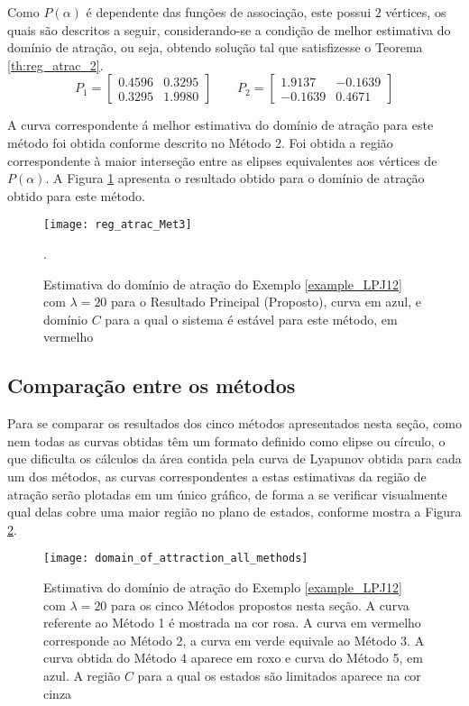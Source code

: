 Como $P(\alpha)$ é dependente das funções de associação, este possui $2$ vértices, os quais são descritos a seguir, considerando-se a condição de melhor estimativa do domínio de atração, ou seja, obtendo solução tal que satisfizesse o Teorema \ref{th:reg_atrac_2}.
\begin{equation*}
P_1 =\begin{bmatrix}0.4596&0.3295\\0.3295&1.9980\end{bmatrix}\qquad P_2 = \begin{bmatrix}1.9137&-0.1639\\-0.1639&0.4671\end{bmatrix}
\end{equation*}

A curva correspondente á melhor estimativa do domínio de atração para este método foi obtida conforme descrito no Método 2. Foi obtida a região correspondente à maior interseção entre as elipses equivalentes aos vértices de $P(\alpha)$. A Figura \ref{fig:reg_atrac_Met3} apresenta o resultado obtido para o domínio de atração obtido para este método.

\begin{figure}[htbp]
	\centering
	\texttt{[image: reg\_atrac\_Met3]}
	\caption{Estimativa do domínio de atração do Exemplo \ref{example_LPJ12} com $\lambda = 20$ para o Resultado Principal (Proposto), curva em azul, e domínio $C$ para a qual o sistema é estável para este método, em vermelho}.
	\label{fig:reg_atrac_Met3}
\end{figure}

\subsection{Comparação entre os métodos}

Para se comparar os resultados dos cinco métodos apresentados nesta seção, como nem todas as curvas obtidas têm um formato definido como elipse ou círculo, o que dificulta os cálculos da área contida pela curva de Lyapunov obtida para cada um dos métodos, as curvas correspondentes a estas estimativas da região de atração serão plotadas em um único gráfico, de forma a se verificar visualmente qual delas cobre uma maior região no plano de estados, conforme mostra a Figura \ref{fig:reg_atrac_all_met}.


\begin{figure}[htbp]
	\centering
	\texttt{[image: domain\_of\_attraction\_all\_methods]}
	\caption{Estimativa do domínio de atração do Exemplo \ref{example_LPJ12} com $\lambda = 20$ para os cinco Métodos propostos nesta seção. A curva referente ao Método 1 é mostrada na cor rosa. A curva em vermelho corresponde ao  Método 2, a curva em verde equivale ao  Método 3. A curva obtida do  Método 4 aparece em roxo e curva do  Método 5, em azul. A região $C$ para a qual os estados são limitados aparece na cor cinza}
	\label{fig:reg_atrac_all_met}
\end{figure}

